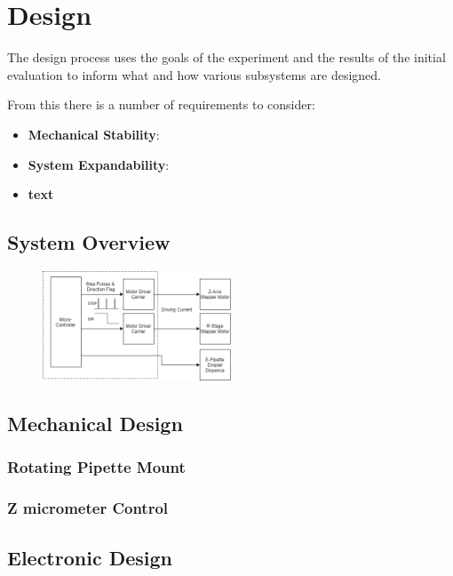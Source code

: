 \chapter{Design}\label{C:design}

The design process uses the goals of the experiment and the results of the initial evaluation to inform what and how various subsystems are designed.

From this there is a number of requirements to consider:

\begin{itemize}
    \item \textbf{Mechanical Stability}:
    \item \textbf{System Expandability}:
    \item \textbf{text}
\end{itemize}

\section{System Overview}

\begin{figure}[h]
    \begin{center}
        \includegraphics[width=0.5\textwidth]{img/ED_block_diag.png}
    \end{center}
\end{figure}

\section{Mechanical Design}

\subsection{Rotating Pipette Mount}

\subsection{Z micrometer Control}

\section{Electronic Design}

